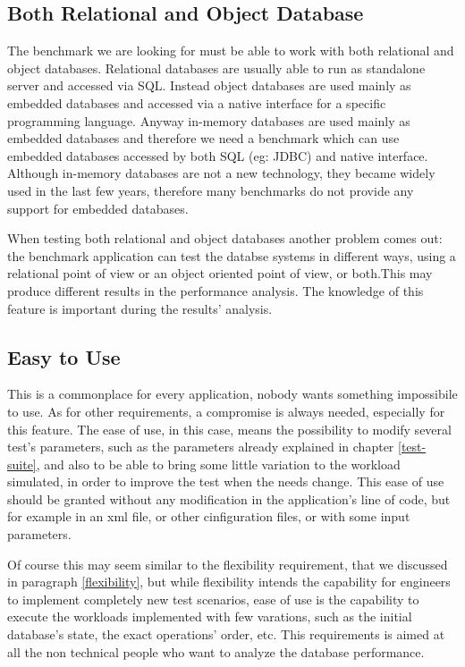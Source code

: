 		\subsection{Both Relational and Object Database}
The benchmark we are looking for must be able to work with both relational and object databases. Relational databases are usually able to run as standalone server and accessed via SQL. Instead object databases are used mainly as embedded databases and accessed via a native interface for a specific programming language. Anyway in-memory databases are used mainly as embedded databases and therefore we need a benchmark which can use embedded databases accessed by both SQL (eg: JDBC) and native interface. Although in-memory databases are not a new technology, they became widely used in the last few years, therefore many benchmarks do not provide any support for embedded databases.

When testing both relational and object databases another problem comes out: the benchmark application can test the databse systems in different ways, using a relational point of view or an object oriented point of view, or both.This may produce different results in the performance analysis. The knowledge of this feature is important during the results' analysis.

		\subsection{Easy to Use}
This is a commonplace for every application, nobody wants something impossibile to use. As for other requirements, a compromise is always needed, especially for this feature. The ease of use, in this case, means the possibility to modify several test's parameters, such as the parameters already explained in chapter \ref{test-suite}, and also to be able to bring some little variation to the workload simulated, in order to improve the test when the needs change. This ease of use should be granted without any modification in the application's line of code, but for example in an xml file, or other cinfiguration files, or with some input parameters.

Of course this may seem similar to the flexibility requirement, that we discussed in paragraph \ref{flexibility}, but while flexibility intends the capability for engineers to implement completely new test scenarios, ease of use is the capability to execute the workloads implemented with few varations, such as the initial database's state, the exact operations' order, etc. This requirements is aimed at all the non technical people who want to analyze the database performance.

